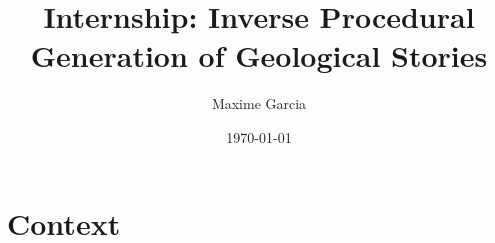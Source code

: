\documentclass[a4paper,11pt]{article}
\title{Internship: Inverse Procedural Generation of Geological Stories}
\author{Maxime Garcia}
\date{\today}
\begin{document}
\maketitle
\section{Context}

\end{document}
